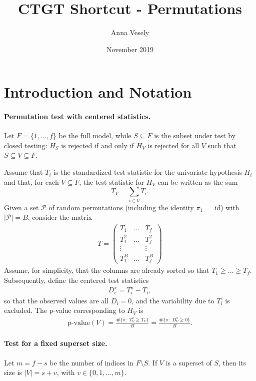 \documentclass[11pt,a4paper,openright,twoside]{article}
\title{CTGT Shortcut - Permutations}
\author{Anna Vesely}
\date{November 2019}
\begin{document}
\maketitle





\section{Introduction and Notation}
\paragraph{Permutation test with centered statistics.}
Let $F=\{1,\ldots, f\}$ be the full model, while $S\subseteq F$ is the subset under test by closed testing: $H_S$ is rejected if and only if $H_V$ is rejected for all $V$ such that $S\subseteq V\subseteq F$.

Assume that $T_i$ is the standardized test statistic for the univariate hypothesis $H_i$ and that, for each $V\subseteq F$, the test statistic for $H_V$ can be written as the sum
\[T_V=\sum_{i\in V}T_i.\]
Given a set $\mathcal{P}$ of random permutations (including the identity $\pi_1=$ id) with $|\mathcal{P}|=B$, consider the matrix
\begin{align*}
T=
\begin{pmatrix}
T_1 & \ldots & T_f\\
T_1^2 & \ldots & T_f^2\\
\vdots &  & \vdots\\
T_1^B & \ldots & T_f^B
\end{pmatrix}
\end{align*}
Assume, for simplicity, that the columns are already sorted so that $T_1\geq\ldots\geq T_f$. Subsequently, define the centered test statistics
\begin{align*}
D_i^{\pi}=T_i^{\pi}-T_i,
\end{align*}
so that the observed values are all $D_i=0$, and the variability due to $T_i$ is excluded. The p-value corresponding to $H_V$ is
\begin{align*}
\text{p-value}(V)=\frac{\#\{\pi\,:\,T_V^{\pi}\geq T_V\}}{B}=\frac{\#\{\pi\,:\,D_V^{\pi}\geq 0\}}{B}.
\end{align*}


\vspace{3mm}
\paragraph{Test for a fixed superset size.} Let $m=f-s$ be the number of indices in $F\setminus S$. If $V$ is a superset of $S$, then its size is $|V|=s+v$, with $v\in\{0,1,\ldots,m\}$.
\end{document}
